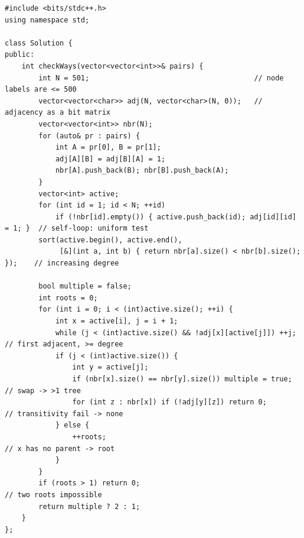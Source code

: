\begin{lstlisting}[caption={Number of Ways to Reconstruct a Tree (LeetCode 1719) -- degree-sorted parent hunt + containment}, label={lst:c25-summit}]
#include <bits/stdc++.h>
using namespace std;

class Solution {
public:
    int checkWays(vector<vector<int>>& pairs) {
        int N = 501;                                       // node labels are <= 500
        vector<vector<char>> adj(N, vector<char>(N, 0));   // adjacency as a bit matrix
        vector<vector<int>> nbr(N);
        for (auto& pr : pairs) {
            int A = pr[0], B = pr[1];
            adj[A][B] = adj[B][A] = 1;
            nbr[A].push_back(B); nbr[B].push_back(A);
        }
        vector<int> active;
        for (int id = 1; id < N; ++id)
            if (!nbr[id].empty()) { active.push_back(id); adj[id][id] = 1; }  // self-loop: uniform test
        sort(active.begin(), active.end(),
             [&](int a, int b) { return nbr[a].size() < nbr[b].size(); });    // increasing degree

        bool multiple = false;
        int roots = 0;
        for (int i = 0; i < (int)active.size(); ++i) {
            int x = active[i], j = i + 1;
            while (j < (int)active.size() && !adj[x][active[j]]) ++j;         // first adjacent, >= degree
            if (j < (int)active.size()) {
                int y = active[j];
                if (nbr[x].size() == nbr[y].size()) multiple = true;          // swap -> >1 tree
                for (int z : nbr[x]) if (!adj[y][z]) return 0;                // transitivity fail -> none
            } else {
                ++roots;                                                     // x has no parent -> root
            }
        }
        if (roots > 1) return 0;                                             // two roots impossible
        return multiple ? 2 : 1;
    }
};
\end{lstlisting}

